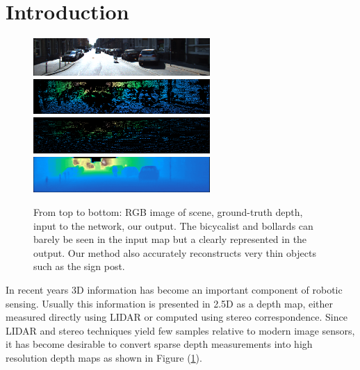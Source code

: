 \section{Introduction}
\begin{figure}
  \includegraphics[width=0.6\textwidth]{intro-rgb}\\
  \includegraphics[width=0.6\textwidth]{intro-ground}\\
  \includegraphics[width=0.6\textwidth]{intro-input}\\
  \includegraphics[width=0.6\textwidth]{intro-pred}
  \caption{From top to bottom: RGB image of scene, ground-truth depth, input to the network, our output. The bicycalist and bollards can barely be seen in the input map but a clearly represented in the output. Our method also accurately reconstructs very thin objects such as the sign post.}
  \label{fig:intro}
\end{figure}
In recent years 3D information has become an important component of robotic sensing. Usually this information is presented in 2.5D as a depth map, either measured directly using LIDAR or computed using stereo correspondence. Since LIDAR and stereo techniques yield few samples relative to modern image sensors, it has become desirable to convert sparse depth measurements into high resolution depth maps as shown in Figure (\ref{fig:intro}).



